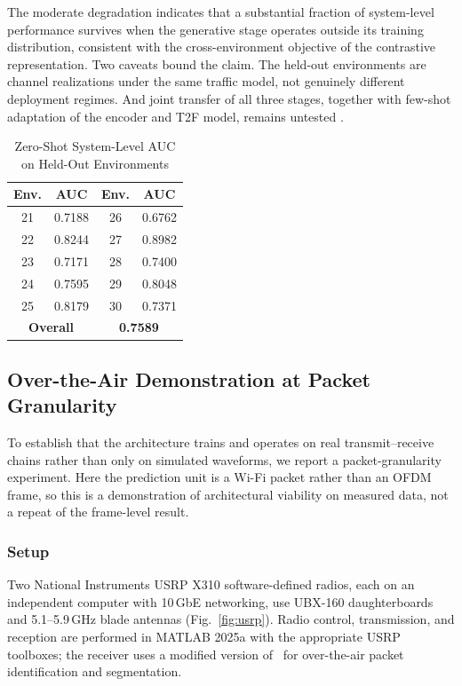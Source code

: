 \documentclass[lettersize,journal]{IEEEtran}
\begin{document}
The moderate degradation indicates that a substantial fraction of
system-level performance survives when the generative stage operates
outside its training distribution, consistent with the
cross-environment objective of the contrastive representation. Two
caveats bound the claim. The held-out environments are channel
realizations under the same traffic model, not genuinely different
deployment regimes. And joint transfer of all three stages, together
with few-shot adaptation of the encoder and T2F model, remains untested
\cite{Cullen2023,Shaghluf2021,Nasser2021}.


\begin{table}[!t]
\centering
\caption{Zero-Shot System-Level AUC on Held-Out Environments}
\label{tab:zeroshot}
\renewcommand{\arraystretch}{1.15}
\begin{tabular}{@{}cccc@{}}
\toprule
\textbf{Env.} & \textbf{AUC} & \textbf{Env.} & \textbf{AUC} \\
\midrule
21 & 0.7188 & 26 & 0.6762 \\
22 & 0.8244 & 27 & 0.8982 \\
23 & 0.7171 & 28 & 0.7400 \\
24 & 0.7595 & 29 & 0.8048 \\
25 & 0.8179 & 30 & 0.7371 \\
\midrule
\multicolumn{2}{c}{\textbf{Overall}} & \multicolumn{2}{c}{\textbf{0.7589}} \\
\bottomrule
\end{tabular}
\end{table}

\subsection{\textbf{Over-the-Air Demonstration at Packet Granularity}}
\label{sec:ota}
To establish that the architecture trains and operates on real transmit--receive
chains rather than only on simulated waveforms, we report a packet-granularity
experiment. Here the prediction unit is a Wi-Fi packet rather than an OFDM
frame, so this is a demonstration of architectural viability on measured data,
not a repeat of the frame-level result.

\subsubsection{\textbf{Setup}}
Two National Instruments USRP X310 software-defined radios, each on an
independent computer with 10\,GbE networking, use UBX-160 daughterboards and
5.1--5.9\,GHz blade antennas (Fig.~\ref{fig:usrp}). Radio control, transmission,
and reception are performed in MATLAB 2025a with the appropriate USRP toolboxes;
the receiver uses a modified version of~\cite{MathworksRecover} for over-the-air
packet identification and segmentation.
\end{document}
